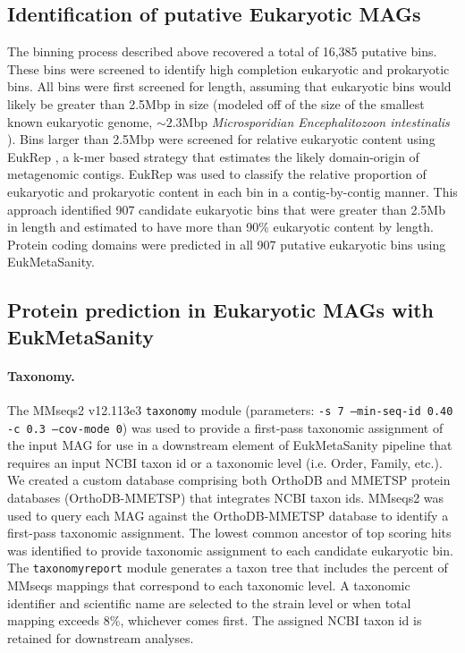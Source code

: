 \documentclass[12pt]{article}
\numberwithin{equation}{section}
\begin{document}
\subsection*{Identification of putative Eukaryotic MAGs} The binning process described above recovered a total of 16,385 putative bins. These bins were screened to identify high completion eukaryotic and prokaryotic bins. All bins were first screened for length, assuming that eukaryotic bins would likely be greater than 2.5Mbp in size (modeled off of the size of the smallest known eukaryotic genome, $\sim 2.3$Mbp \textit{Microsporidian Encephalitozoon intestinalis} \citep{Corradi2010complete}). Bins larger than 2.5Mbp were screened for relative eukaryotic content using EukRep \citep{West2018Genome-reconstruction}, a k-mer based strategy that estimates the likely domain-origin of metagenomic contigs. EukRep was used to classify the relative proportion of eukaryotic and prokaryotic content in each bin in a contig-by-contig manner. This approach identified 907 candidate eukaryotic bins that were greater than 2.5Mb in length and estimated to have more than 90\% eukaryotic content by length. Protein coding domains were predicted in all 907 putative eukaryotic bins using EukMetaSanity. 

\subsection*{Protein prediction in Eukaryotic MAGs with EukMetaSanity} 
\paragraph{Taxonomy.} The MMseqs2 v12.113e3 \citep{Steinegger2017, Steinegger2018, Mirdita2019} \texttt{taxonomy} module (parameters: \texttt{-s 7 --min-seq-id 0.40 -c 0.3 --cov-mode 0}) was used to provide a first-pass taxonomic assignment of the input MAG for use in a downstream element of EukMetaSanity pipeline that requires an input NCBI taxon id or a taxonomic level (i.e. Order, Family, etc.). We created a custom database comprising both OrthoDB \citep{Kriventseva2018} and MMETSP \citep{Keeling2014} protein databases (OrthoDB-MMETSP) that integrates NCBI taxon ids. MMseqs2 was used to query each MAG against the OrthoDB-MMETSP database to identify a first-pass taxonomic assignment. The lowest common ancestor of top scoring hits was identified to provide taxonomic assignment to each candidate eukaryotic bin. The \texttt{taxonomyreport} module generates a taxon tree that includes the percent of MMseqs mappings that correspond to each taxonomic level. A taxonomic identifier and scientific name are selected to the strain level or when total mapping exceeds 8\%, whichever comes first. The assigned NCBI taxon id is retained for downstream analyses. 
\end{document}

